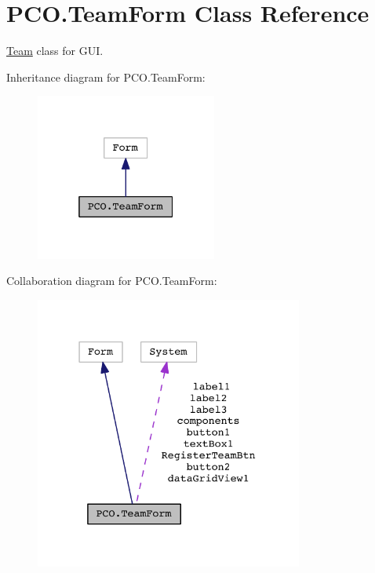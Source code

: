 \hypertarget{classPCO_1_1TeamForm}{}\section{P\+C\+O.\+Team\+Form Class Reference}
\label{classPCO_1_1TeamForm}


\hyperlink{classTeam}{Team} class for G\+UI.  




Inheritance diagram for P\+C\+O.\+Team\+Form\+:\nopagebreak
\begin{figure}[H]
\begin{center}
\leavevmode
\includegraphics[width=169pt]{classPCO_1_1TeamForm__inherit__graph}
\end{center}
\end{figure}


Collaboration diagram for P\+C\+O.\+Team\+Form\+:\nopagebreak
\begin{figure}[H]
\begin{center}
\leavevmode
\includegraphics[width=250pt]{classPCO_1_1TeamForm__coll__graph}
\end{center}
\end{figure}
